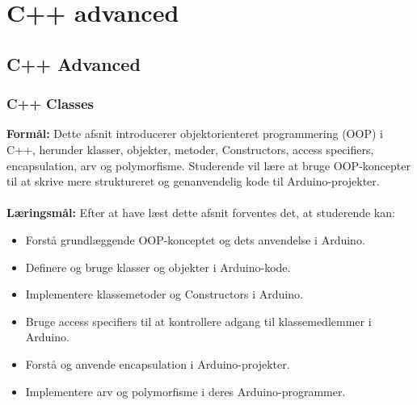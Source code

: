 \part{C++ advanced}
\chapter{C++ Advanced}
\section{C++ Classes}
\textbf{Formål:} Dette afsnit introducerer objektorienteret programmering (OOP) i C++, herunder klasser, objekter, metoder, Constructors, access specifiers, encapsulation, arv og polymorfisme. Studerende vil lære at bruge OOP-koncepter til at skrive mere struktureret og genanvendelig kode til Arduino-projekter.
\\\\
\noindent\textbf{Læringsmål:} Efter at have læst dette afsnit forventes det, at studerende kan:
\begin{itemize}
	\item Forstå grundlæggende OOP-konceptet og dets anvendelse i Arduino.
	\item Definere og bruge klasser og objekter i Arduino-kode.
	\item Implementere klassemetoder og Constructors i Arduino.
	\item Bruge access specifiers til at kontrollere adgang til klassemedlemmer i Arduino.
	\item Forstå og anvende encapsulation i Arduino-projekter.
	\item Implementere arv og polymorfisme i deres Arduino-programmer.
\end{itemize}


